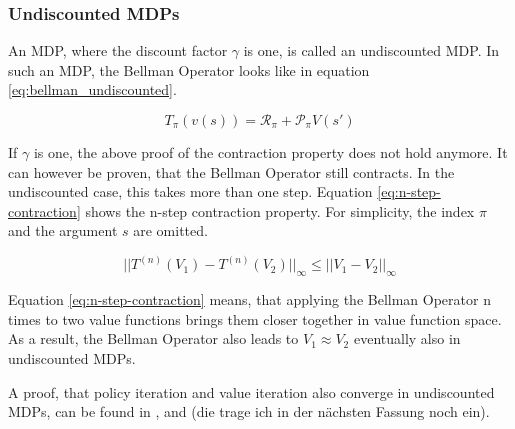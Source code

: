 \subsubsection*{Undiscounted MDPs}

An MDP, where the discount factor $\gamma$ is one, is called an undiscounted MDP. In such an MDP, the Bellman Operator looks like in equation \ref{eq:bellman_undiscounted}.

\begin{equation}
T_\pi(v(s))=\mathcal{R}_\pi + \mathcal{P}_\pi V(s')
\label{eq:bellman_undiscounted}
\end{equation}

If $\gamma$ is one, the above proof of the contraction property does not hold anymore. It can however be proven, that the Bellman Operator still contracts. In the undiscounted case, this takes more than one step. Equation \ref{eq:n-step-contraction} shows the n-step contraction property. For simplicity, the index $\pi$ and the argument $s$ are omitted.

\begin{equation}
||T^{(n)}(V_1)-T^{(n)}(V_2)||_\infty \leq ||V_1-V_2||_\infty
\label{eq:n-step-contraction}
\end{equation}

Equation \ref{eq:n-step-contraction} means, that applying the Bellman Operator n times to two value functions brings them closer together in value function space. As a result, the Bellman Operator also leads to $V_1 \approx V_2$ eventually also in undiscounted MDPs.

A proof, that policy iteration and value iteration also converge in undiscounted MDPs, can be found in \cite{},\cite{} and \cite{} (die trage ich in der nächsten Fassung noch ein).


